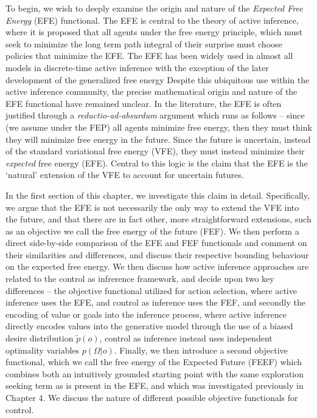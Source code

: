 To begin, we wish to deeply examine the origin and nature of the \emph{Expected Free Energy} (EFE) functional. The EFE is central to the theory of active inference, where it is proposed that all agents under the free energy principle, which must seek to minimize the long term path integral of their surprise must choose policies that minimize the EFE. The EFE has been widely used in almost all models in discrete-time active inference \citep{friston_active_2015,friston2017active,friston2018deep,friston2017process,da2020active} with the exception of the later development of the generalized free energy \citep{friston2015active,parr2017uncertainty,parr2017active}%
 Despite this ubiquitous use within the active inference community, the precise mathematical origin and nature of the EFE functional have remained unclear. In the literature, the EFE is often justified through a \emph{reductio-ad-absurdum} argument \citep{friston2015active} which runs as follows -- since (we assume under the FEP) all agents minimize free energy, then they must think they will minimize free energy in the future. Since the future is uncertain, instead of the standard variational free energy (VFE), they must instead minimize their \emph{expected} free energy (EFE). Central to this logic is the claim that the EFE is the `natural' extension of the VFE to account for uncertain futures. 

In the first section of this chapter, we investigate this claim in detail. Specifically, we argue that the EFE is not necessarily the only way to extend the VFE into the future, and that there are in fact other, more straightforward extensions, such as an objective we call the free energy of the future (FEF). We then perform a direct side-by-side comparison of the EFE and FEF functionals and comment on their similarities and differences, and discuss their respective bounding behaviour on the expected free energy. We then discuss how active inference approaches are related to the control as infrerence framework, and decide upon two key differences -- the objective functional utilized for action selection, where active inference uses the EFE, and control as inference uses the FEF, and secondly the encoding of value or goals into the inference process, where active inference directly encodes values into the generative model through the use of a biased desire distribution $\tilde{p}(o)$, control as inference instead uses independent optimality variables $p(\Omega | o)$. Finally, we then introduce a second objective functional, which we call the free energy of the Expected Future (FEEF) which combines both an intuitively grounded starting point with the same exploration seeking term as is present in the EFE, and which was investigated previously in Chapter 4. We discuss the nature of different possible objective functionals for control.

